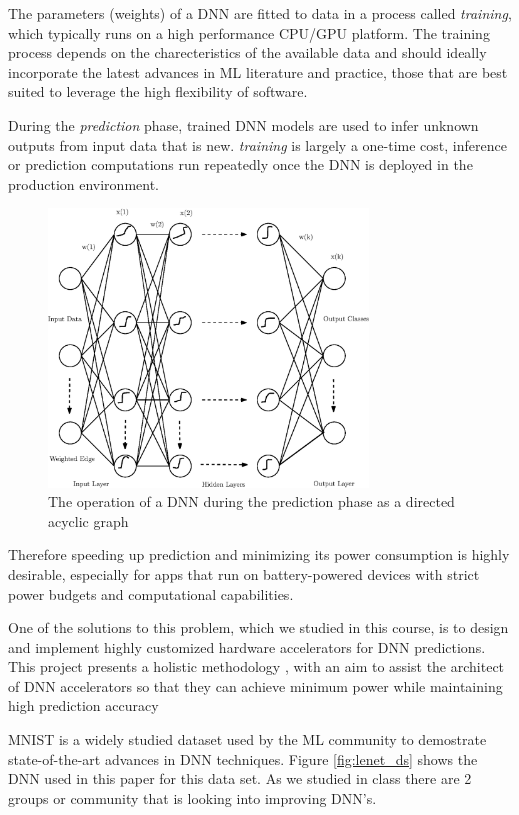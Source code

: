 \documentclass[letterpaper, 10 pt, conference]{ieeeconf}
\begin{document}
The parameters (weights) of a DNN are fitted to data in a process called 
\textit{training}, which typically runs on a high performance CPU/GPU platform.
The training process depends on the charecteristics of the available data and
should ideally incorporate the latest advances in ML literature and practice,
those that are best suited to leverage the high flexibility of software.

During the \textit{prediction} phase, trained DNN models are used to infer
unknown outputs from input data that is new. \textit{training} is largely a 
one-time cost, inference  or prediction computations run repeatedly once
the DNN is deployed in the production environment.

\begin{figure}[h]
    \centering
    \includegraphics[width=85mm,scale=1.1]{nn}
    \caption{The operation of a DNN during the prediction phase as 
      a directed acyclic graph}
    \label{fig:nn}
\end{figure}
Therefore speeding up prediction and minimizing its power consumption is 
highly desirable, especially for apps that run on battery-powered devices with
strict power budgets and computational capabilities.

One of the solutions to this problem, which we studied in this course, is to
design and implement highly customized hardware accelerators for DNN predictions.
This project presents a holistic methodology , with an aim to assist the architect 
of DNN accelerators so that they can achieve minimum power while maintaining high prediction accuracy

MNIST is a widely studied dataset used by the ML community to demostrate state-of-the-art advances in DNN techniques. Figure \ref{fig:lenet_ds} shows the DNN used in this paper for this data set. As we studied in class there are 2 groups or community that is looking into improving DNN's. 
\end{document}
